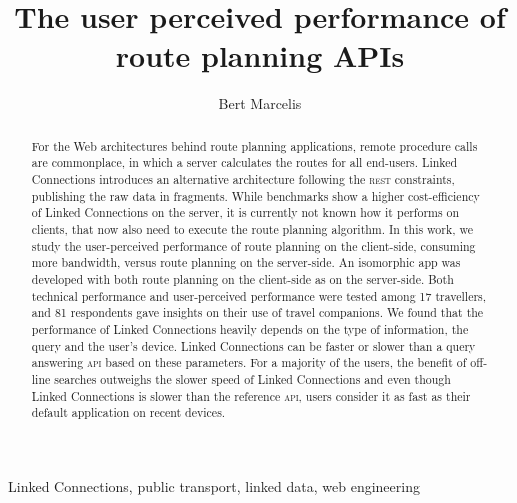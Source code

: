\documentclass[twocolumn]{phdsymp} %
\begin{document}
\title{The user perceived performance of route planning APIs} %

\author{Bert Marcelis}


\maketitle

\begin{abstract}
For the Web architectures behind route planning applications, remote procedure calls are commonplace, in which a server calculates the routes for all end-users. Linked Connections introduces an alternative architecture following the \textsc{rest} constraints, publishing the raw data in fragments. While benchmarks show a higher cost-efficiency of Linked Connections on the server, it is currently not known how it performs on clients, that now also need to execute the route planning algorithm. In this work, we study the user-perceived performance of route planning on the client-side, consuming more bandwidth, versus route planning on the server-side. An isomorphic app was developed with both route planning on the client-side as on the server-side. Both technical performance and user-perceived performance were tested among 17 travellers, and 81 respondents gave insights on their use of travel companions.
We found that the performance of Linked Connections heavily depends on the type of information, the query and the user’s device. Linked Connections can be faster or slower than a query answering \textsc{api} based on these parameters. For a majority of the users, the benefit of off-line searches outweighs the slower speed of Linked Connections and even though Linked Connections is slower than the reference \textsc{api}, users consider it as fast as their default application on recent devices.


\end{abstract}

\begin{keywords}
Linked Connections, public transport, linked data, web engineering
\end{keywords}
\end{document}
